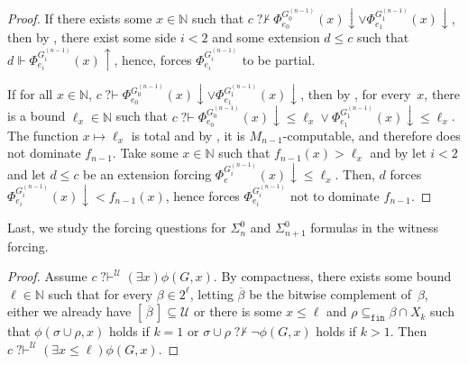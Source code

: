 \documentclass{article}
\def\NN{\mathbb{N}}
\def\WW{\mathbb{W}}
\def\U{\mathcal{U}}
\def\M{\mathcal{M}}
\newcommand{\converge}{\!\!\downarrow}
\newcommand{\diverge}{\!\!\uparrow}
\newcommand{\qvdash}{\operatorname{{?}{\vdash}}}
\newcommand{\nqvdash}{\operatorname{{?}{\nvdash}}}
\newcommand{\finsub}{\subseteq_{\mathtt{fin}}}
\numberwithin{theorem}{section}
\newtheorem{lemma}[theorem]{Lemma}
\theoremstyle{definition}
\begin{document}
\begin{proof}
If there exists some $x \in \NN$ such that $c \nqvdash \Phi_{e_0}^{G_0^{(n-1)}}(x) \converge \vee \Phi_{e_1}^{G_1^{(n-1)}}(x) \converge$, then by , there exist some side $i < 2$ and some extension $d \leq c$ such that $d \Vdash \Phi_{e_i}^{G_i^{(n-1)}}(x) \diverge$, hence, forces $\Phi_{e_i}^{G_i^{(n-1)}}$ to be partial. 

If for all $x \in \NN$, $c \qvdash \Phi_{e_0}^{G_0^{(n-1)}}(x) \converge \vee \Phi_{e_1}^{G_1^{(n-1)}}(x) \converge$, then by , for every~$x$, there is a bound $\ell_x \in \NN$ such that $c \qvdash \Phi_{e_0}^{G_0^{(n-1)}}(x) \converge \leq \ell_x \vee \Phi_{e_1}^{G_1^{(n-1)}}(x) \converge \leq \ell_x$. The function $x \mapsto \ell_x$ is total and by , it is $M_{n-1}$-computable, and therefore does not dominate $f_{n-1}$. Take some $x \in \NN$ such that $f_{n-1}(x) > \ell_x$ and by  let $i < 2$ and let $d \leq c$ be an extension forcing $ \Phi_e^{G_i^{(n-1)}}(x)\converge \leq \ell_x$. Then, $d$ forces $\Phi_{e_i}^{G_i^{(n-1)}}(x) \converge < f_{n-1}(x)$, hence forces $\Phi_{e_i}^{G_i^{(n-1)}}$ not to dominate $f_{n-1}$.  
\end{proof}

Last, we study the forcing questions for $\Sigma^0_n$ and $\Sigma^0_{n+1}$ formulas in the witness forcing.


\begin{proof}
Assume $c \qvdash^{\U} (\exists x) \phi(G,x)$. By compactness, there exists some bound $\ell \in \NN$ such that for every $\beta \in 2^{\ell}$, letting $\overline{\beta}$ be the bitwise complement of~$\beta$, either we already have  $[\,\overline{\beta}\,] \subseteq \U$ or there is some $x \leq \ell$ and $\rho \finsub \beta \cap X_{k}$ such that $\phi(\sigma \cup \rho,x)$ holds if $k = 1$ or $\sigma \cup \rho \nqvdash \neg \phi(G,x)$ holds if $k > 1$.
Then $c \qvdash^{\U} (\exists x \leq \ell) \phi(G,x)$.
\end{proof}
\end{document}
